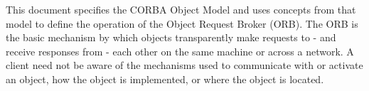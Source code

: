 This document specifies the CORBA Object Model and uses concepts from
that model to define the operation of the Object Request Broker (ORB).
The ORB is the basic mechanism by which objects transparently make
requests to - and receive responses from - each other on the same
machine or across a network. A client need not be aware of the
mechanisms used to communicate with or activate an object, how the
object is implemented, or where the object is located.
